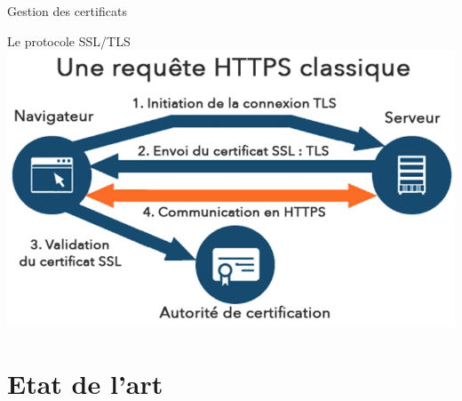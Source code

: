 \documentclass{bredelebeamer}
\begin{document}

\begin{frame}{Gestion des certificats}

\end{frame}


\begin{frame}{Le protocole SSL/TLS}
  \includegraphics[width=\linewidth]{../medias/protocole-tls.png}
\end{frame}

\section{Etat de l'art}

\end{document}
